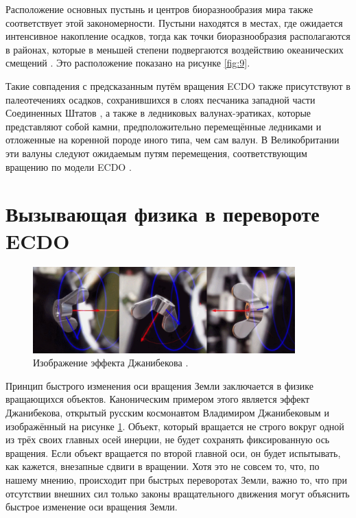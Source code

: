 \documentclass[10pt,twocolumn,letterpaper]{article}
\begin{document}
Расположение основных пустынь и центров биоразнообразия мира также соответствует этой закономерности. Пустыни находятся в местах, где ожидается интенсивное накопление осадков, тогда как точки биоразнообразия располагаются в районах, которые в меньшей степени подвергаются воздействию океанических смещений \cite{28}. Это расположение показано на рисунке \ref{fig:9}.

Такие совпадения с предсказанным путём вращения ECDO также присутствуют в палеотечениях осадков, сохранившихся в слоях песчаника западной части Соединенных Штатов \cite{21}, а также в ледниковых валунах-эратиках, которые представляют собой камни, предположительно перемещённые ледниками и отложенные на коренной породе иного типа, чем сам валун. В Великобритании эти валуны следуют ожидаемым путям перемещения, соответствующим вращению по модели ECDO \cite{67,68}.

\section{Вызывающая физика в перевороте ECDO}

\begin{figure}
\begin{center}

\includegraphics[width=0.9\textwidth]{dzhani.jpg}
\end{center}
   \caption{Изображение эффекта Джанибекова \cite{28}.}
\label{fig:10}
\end{figure}

Принцип быстрого изменения оси вращения Земли заключается в физике вращающихся объектов. Каноническим примером этого является эффект Джанибекова, открытый русским космонавтом Владимиром Джанибековым \cite{37} и изображённый на рисунке \ref{fig:10}. Объект, который вращается не строго вокруг одной из трёх своих главных осей инерции, не будет сохранять фиксированную ось вращения. Если объект вращается по второй главной оси, он будет испытывать, как кажется, внезапные сдвиги в вращении. Хотя это не совсем то, что, по нашему мнению, происходит при быстрых переворотах Земли, важно то, что при отсутствии внешних сил только законы вращательного движения могут объяснить быстрое изменение оси вращения Земли.
\end{document}
